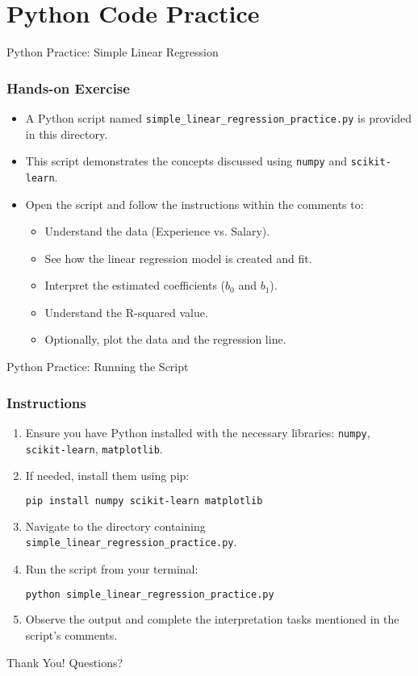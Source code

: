 \documentclass[aspectratio=169]{beamer}
\begin{document}
\section{Python Code Practice}

\begin{frame}{Python Practice: Simple Linear Regression}
    \frametitle{Hands-on Exercise}
    \begin{itemize}
        \item A Python script named \texttt{simple\_linear\_regression\_practice.py} is provided in this directory.
        \item This script demonstrates the concepts discussed using \texttt{numpy} and \texttt{scikit-learn}.
        \item Open the script and follow the instructions within the comments to:
        \begin{itemize}
            \item Understand the data (Experience vs. Salary).
            \item See how the linear regression model is created and fit.
            \item Interpret the estimated coefficients ($b_0$ and $b_1$).
            \item Understand the R-squared value.
            \item Optionally, plot the data and the regression line.
        \end{itemize}
    \end{itemize}
\end{frame}

\begin{frame}[fragile]{Python Practice: Running the Script}
    \frametitle{Instructions}
    \begin{enumerate}
        \item Ensure you have Python installed with the necessary libraries: \texttt{numpy}, \texttt{scikit-learn}, \texttt{matplotlib}.
        \item If needed, install them using pip:
        \begin{lstlisting}[language=bash]
pip install numpy scikit-learn matplotlib
        \end{lstlisting}
        \item Navigate to the directory containing \texttt{simple\_linear\_regression\_practice.py}.
        \item Run the script from your terminal:
        \begin{lstlisting}[language=bash]
python simple_linear_regression_practice.py
        \end{lstlisting}
        \item Observe the output and complete the interpretation tasks mentioned in the script's comments.
    \end{enumerate}
\end{frame}

\begin{frame}
  \centering
  \Huge Thank You!
  \vspace{1cm}
  \normalsize Questions?
\end{frame}
\end{document}
